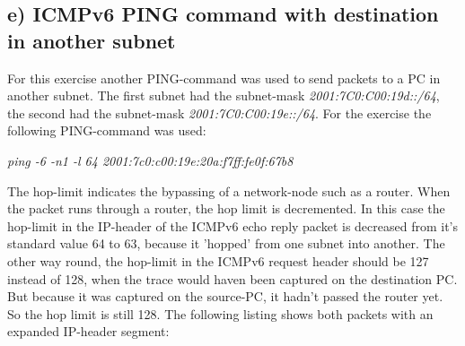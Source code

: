 \subsection{e) ICMPv6 PING command with destination in another subnet}
For this exercise another PING-command was used to send packets to a PC in another subnet. The first subnet had the subnet-mask \textit{2001:7C0:C00:19d::/64}, the second had the subnet-mask \textit{2001:7C0:C00:19e::/64}. For the exercise the following PING-command was used:
\begin{center}
	\textit{ping -6 -n1 -l 64 2001:7c0:c00:19e:20a:f7ff:fe0f:67b8}
\end{center}
The hop-limit indicates the bypassing of a network-node such as a router. When the packet runs through a router, the hop limit is decremented. In this case the hop-limit in the IP-header of the ICMPv6 echo reply packet is decreased from it's standard value 64 to 63, because it 'hopped' from one subnet into another. The other way round, the hop-limit in the ICMPv6 request header should be 127 instead of 128, when the trace would haven been captured on the destination PC. But because it was captured on the source-PC, it hadn't passed the router yet. So the hop limit is still 128. The following listing shows both packets with an expanded IP-header segment:
\\
